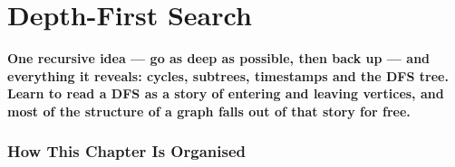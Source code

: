 %
\chapter{Depth-First Search}
\label{ch:dfs}

\begin{tcolorbox}[enhanced, colback=white, colframe=secondaryblue, boxrule=1pt, arc=2mm,
                  left=10pt, right=10pt]
\textbf{\large\textcolor{primaryblue}{One recursive idea --- go as deep as possible, then back up --- and everything it reveals: cycles, subtrees, timestamps and the DFS tree. Learn to read a DFS as a story of entering and leaving vertices, and most of the structure of a graph falls out of that story for free.}}
\end{tcolorbox}


\subsection*{How This Chapter Is Organised}

